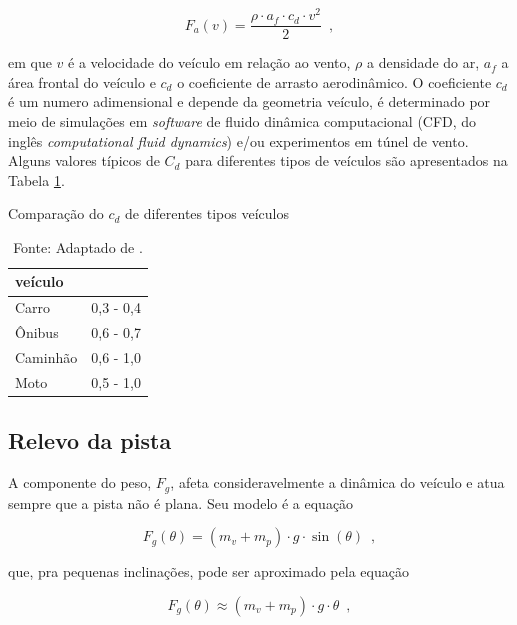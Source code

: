 \begin{equation}
	\label{eq:Fa}
	F_a(v) = \frac{\rho \cdot a_f \cdot c_d \cdot v^2}{2}
	\enspace,
\end{equation}

em que $v$ é a velocidade do veículo em relação ao vento, $\rho$ a densidade do ar, $a_{f}$ a área frontal do
veículo e $c_{d}$ o coeficiente de arrasto aerodinâmico.
O coeficiente $c_{d}$ é um numero adimensional e depende da geometria veículo, é determinado por meio de simulações em \textit{software} de fluido
dinâmica
computacional (CFD, do inglês \textit{computational fluid dynamics}) e/ou experimentos em túnel de vento\cite{book:guzzella2012vehicle}. Alguns
valores típicos de $C_{d}$ para diferentes tipos de
veículos são apresentados na Tabela \ref{tab:ComparacaoCD}.

\begin{table}[h]
	\centering
	\caption{Comparação do $c_{d}$ de diferentes tipos veículos}
	\begin{tabular}{ll}
		\toprule
		\textbf{veículo} & \boldsymbol{$c_{d}$} \\
		\hline
		Carro            & 0,3 - 0,4            \\
		Ônibus           & 0,6 - 0,7            \\
		Caminhão         & 0,6 - 1,0            \\
		Moto             & 0,5 - 1,0            \\
		\bottomrule
	\end{tabular}
	\caption*{\footnotesize Fonte: Adaptado de \citeauthor{book:GroundVehicleDynamics}.}
	\label{tab:ComparacaoCD}
\end{table}

\subsection{Relevo da pista}

A componente do peso, $F_{g}$, afeta consideravelmente a dinâmica do veículo e atua sempre que a pista não é plana. Seu modelo é a equação

\begin{equation}
	\label{eq:Fg}
	F_{g}(\theta) = (m_v + m_p) \cdot g \cdot \sin(\theta)
	\enspace,
\end{equation}

que, pra pequenas inclinações, pode ser aproximado pela equação

\[
	F_{g}(\theta) \approx  (m_v + m_p) \cdot g \cdot \theta
	\enspace,
\]


